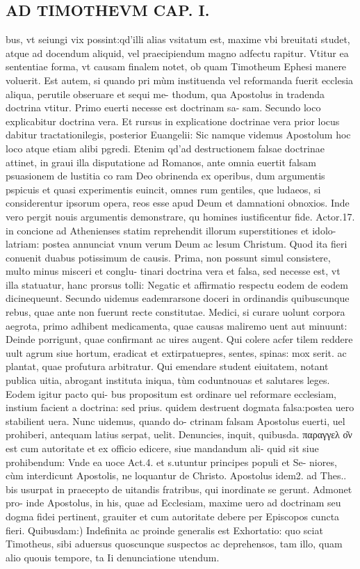 \documentclass{article}
\begin{document}
\begin{pages}
\section*{AD TIMOTHEVM CAP. I. }
\marginpar{[ p.7 ]}\pstart bus, vt seiungi vix possint:qd'illi alias vsitatum est, maxime vbi breuitati studet, atque  ad docendum aliquid, vel praecipiendum magno adfectu rapitur. Vtitur ea sententiae forma, vt causam finalem notet, ob quam Timotheum Ephesi manere voluerit. Est autem, si quando pri mùm instituenda vel reformanda fuerit ecclesia aliqua, perutile obseruare et sequi me- thodum, qua Apostolus in tradenda doctrina vtitur. Primo euerti necesse est doctrinam sa- sam. Secundo loco explicabitur doctrina vera. Et rursus in explicatione doctrinae vera prior locus dabitur tractationilegis, posterior Euangelii: Sic namque  videmus Apostolum hoc loco atque  etiam alibi pgredi. Etenim qd'ad destructionem falsae doctrinae attinet, in graui illa disputatione ad Romanos, ante omnia euertit falsam psuasionem de lustitia co ram Deo obrinenda ex operibus, dum argumentis pspicuis et quasi experimentis euincit, omnes rum gentiles, que  ludaeos, si considerentur ipsorum opera, reos esse apud Deum et damnationi obnoxios. Inde vero pergit nouis argumentis demonstrare, qu homines iustificentur fide. Actor.17. in concione ad Athenienses statim reprehendit illorum superstitiones et idolo- latriam: postea annunciat vnum verum Deum ac lesum Christum. Quod ita fieri conuenit duabus potissimum de causis. Prima, non possunt simul consistere, multo minus misceri et conglu- tinari doctrina vera et falsa, sed necesse est, vt illa statuatur, hanc prorsus tolli: Negatic et affirmatio respectu eodem de eodem dicinequeunt. Secundo uidemus eademrarsone doceri in ordinandis quibuscunque  rebus, quae ante non fuerunt recte constitutae. Medici, si curare uolunt corpora aegrota, primo adhibent medicamenta, quae causas maliremo uent aut minuunt: Deinde porrigunt, quae confirmant ac uires augent. Qui colere acfer tilem reddere uult agrum siue hortum, eradicat et extirpatuepres, sentes, spinas: mox serit. ac plantat, quae profutura arbitratur. Qui emendare student eiuitatem, notant publica uitia, abrogant instituta iniqua, tùm coduntnouas et salutares leges. Eodem igitur pacto qui- bus propositum est ordinare uel reformare ecclesiam, instium facient a doctrina: sed prius. quidem destruent dogmata falsa:postea uero stabilient uera. Nunc uidemus, quando do- ctrinam falsam Apostolus euerti, uel prohiberi, antequam latius serpat, uelit. Denuncies,   inquit, quibusda. παραγγελ ο͂ν est cum autoritate et ex officio edicere, siue mandandum ali- quid sit siue prohibendum: Vnde ea uoce Act.4. et s.utuntur principes populi et Se- niores, cùm interdicunt Apostolis, ne loquantur de Christo. Apostolus idem2. ad Thes.. bis usurpat in praecepto de uitandis fratribus, qui inordinate se gerunt. Admonet pro- inde Apostolus, in his, quae ad Ecclesiam, maxime uero ad doctrinam seu dogma fidei pertinent, grauiter et cum autoritate debere per Episcopos cuncta fieri.  \pend\pstart Quibusdam:) Indefinita ac proinde generalis est Exhortatio: quo sciat Timotheus, sibi aduersus quoscunque  suspectos ac deprehensos, tam illo, quam alio quouis tempore, ta Ii denunciatione utendum. 
\end{pages}
\end{document}

